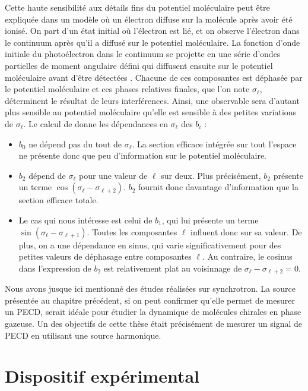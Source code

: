 Cette haute sensibilité aux détails fins du potentiel moléculaire peut être expliquée dans un modèle où un électron diffuse sur la molécule après avoir été ionisé. On part d'un état initial où l'électron est lié, et on observe l'électron dans le continuum après qu'il a diffusé sur le potentiel moléculaire. La fonction d'onde initiale du photoélectron dans le continuum se projette en une série d'ondes partielles de moment angulaire défini qui diffusent ensuite sur le potentiel moléculaire avant d'être détectées . Chacune de ces composantes est déphasée par le potentiel moléculaire et ces phases relatives finales, que l'on note $\sigma_\ell$, déterminent le résultat de leurs interférences. Ainsi, une observable sera d'autant plus sensible au potentiel moléculaire qu'elle est sensible à des petites variations de $\sigma_\ell$. Le calcul de  donne les dépendances en $\sigma_\ell$ des $b_i$ :

\begin{itemize}
\renewcommand{\labelitemi}{$\bullet$}
\setlength\itemsep{1em}
\item $b_0$ ne dépend pas du tout de $\sigma_\ell$. La section efficace intégrée sur tout l'espace ne présente donc que peu d'information sur le potentiel moléculaire.
\item $b_2$ dépend de $\sigma_\ell$ pour une valeur de $\ell$ sur deux. Plus précisément, $b_2$ présente un terme $\cos(\sigma_\ell-\sigma_{\ell+2})$. $b_2$ fournit donc davantage d'information que la section efficace totale.
\item Le cas qui nous intéresse est celui de $b_1$, qui lui présente un terme $\sin(\sigma_\ell-\sigma_{\ell+1})$. Toutes les composantes $\ell$ influent donc sur sa valeur. De plus, on a une dépendance en sinus, qui varie significativement pour des petites valeurs de déphasage entre composantes $\ell$. Au contraire, le cosinus dans l'expression de $b_2$ est relativement plat au voisinnage de $\sigma_\ell-\sigma_{\ell+2} = 0$.
\end{itemize}

Nous avons jusque ici mentionné des études réalisées sur synchrotron. La source présentée au chapitre précédent, si on peut confirmer qu'elle permet de mesurer un PECD, serait idéale pour étudier la dynamique de molécules chirales en phase gazeuse. Un des objectifs de cette thèse était précisément de mesurer un signal de PECD en utilisant une source harmonique.

\section{Dispositif expérimental}
